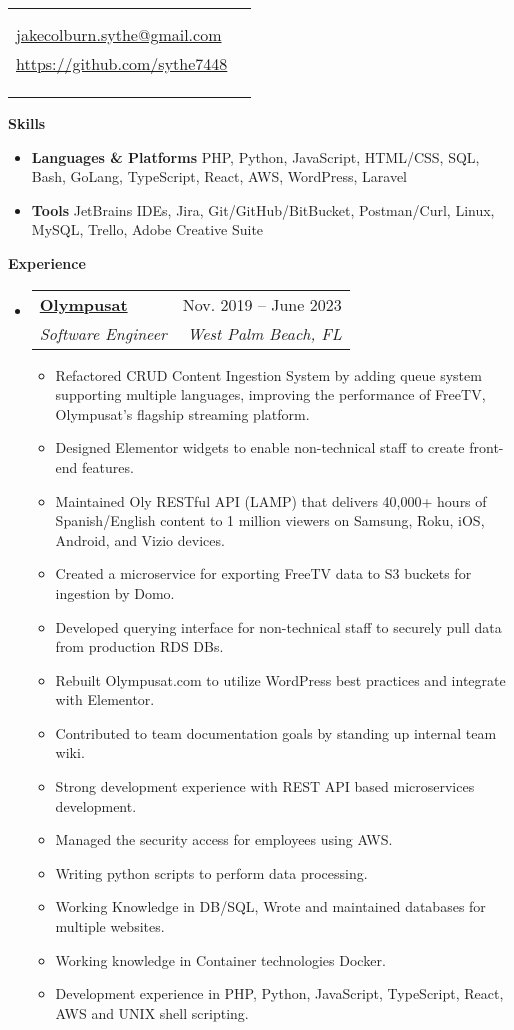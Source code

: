 \documentclass[letterpaper,10pt]{article}[leftmargin=*]
\makeatletter
\def \fullname {Jake Colburn}
\def \subtitle {}
\def \linkedinicon {\faLinkedin}
\def \linkedinlink {https://www.linkedin.com/in/jake-colburn-71401811/}
\def \linkedintext {/jake-colburn}
\def \phoneicon {\faPhone}
\def \phonetext {512-621-6131}
\def \emailicon {\faEnvelope}
\def \emaillink {mailto:jakecolburn.sythe@gmail.com}
\def \emailtext {jakecolburn.sythe@gmail.com}
\def \websiteicon {\faGithub}
\def \websitelink {https://github.com/sythe7448}
\def \websitetext {https://github.com/sythe7448}
\def \headertype {\singlecol} %
\def \entryspacing {-0pt}
\def \linkedin {\linkedinicon \hspace{3pt}\href{\linkedinlink}{\linkedintext}}
\def \phone {\phoneicon \hspace{3pt}{ \phonetext}}
\def \email {\emailicon \hspace{3pt}\href{\emaillink}{\emailtext}}
\def \website {\websiteicon \hspace{3pt}\href{\websitelink}{\websitetext}}
\renewcommand{\section}[2]{\vspace{5pt}
  \colorbox{secondary}{\color{white}\raggedbottom\normalsize\textbf{{#1}{\hspace{7pt}#2}}}
}
\newcommand{\resumeEntryStart}{\begin{itemize}[leftmargin=2.5mm]}
\newcommand{\resumeEntryEnd}{\end{itemize}\vspace{\entryspacing}}
\newcommand{\resumeItemListStart}{\begin{itemize}[leftmargin=4.5mm]}
\newcommand{\resumeItemListEnd}{\end{itemize}}
\newcommand{\resumeItem}[1]{
  \item\small{
    {#1 \vspace{-2pt}}
  }
}
\newcommand{\resumeEntryTSDL}[4]{
  \vspace{-1pt}\item[]
    \begin{tabularx}{0.97\textwidth}{X@{\hspace{60pt}}r}
      \textbf{\color{primary}#1} & {\firabook\color{accent}\small#2} \\
      \textit{\color{accent}\small#3} & \textit{\color{accent}\small#4} \\
    \end{tabularx}\vspace{-6pt}
}
\newcommand{\resumeEntryS}[2]{
  \item[]\small{
    \textbf{\color{primary}#1 }{ #2 \vspace{-6pt}}
  }
}
\newcommand{\doublecol}[6]{
  \begin{tabularx}{\textwidth}{Xr}
    {
      \begin{tabular}[c]{l}
        \fontsize{35}{45}\selectfont{\color{primary}{{\textbf{\fullname}}}} \\
        {\textit{\subtitle}} %
      \end{tabular}
    } & {
      \begin{tabular}[c]{l@{\hspace{1.5em}}l}
        {\small#4} & {\small#1} \\
        {\small#5} & {\small#2} \\
        {\small#6} & {\small#3}
      \end{tabular}
    }
  \end{tabularx}
}
\newcommand{\singlecol}[6]{
  \begin{tabularx}{\textwidth}{Xr}
    {
      \begin{tabular}[b]{l}
        \fontsize{35}{45}\selectfont{\color{primary}{{\textbf{\fullname}}}} \\
        {\textit{\subtitle}} %
      \end{tabular}
    } & {
      \begin{tabular}[c]{l}
        {\small#1} \\
        {\small#2} \\
        {\small#3} \\
        {\small#4} \\
        {\small#5} \\
        {\small#6}
      \end{tabular}
    }
  \end{tabularx}
}
\makeatother
\begin{document}


\headertype{\linkedin}{\email}{\website}{\phone}{}{} %
\vspace{-10pt} %

\section{\faGears}{Skills}
 \resumeEntryStart
  \resumeEntryS{Languages \& Platforms} { PHP, Python, JavaScript, HTML/CSS, SQL, Bash, GoLang, TypeScript, React, AWS, WordPress, Laravel}
  \resumeEntryS{Tools } {JetBrains IDEs, Jira, Git/GitHub/BitBucket, Postman/Curl, Linux, MySQL, Trello, Adobe Creative Suite}
 \resumeEntryEnd

\section{\faPieChart}{Experience}

  \resumeEntryStart
    \resumeEntryTSDL
      {\href{https://www.linkedin.com/company/olympusat/}{Olympusat}}{Nov. 2019 -- June 2023}
      {Software Engineer}{West Palm Beach, FL}
    \resumeItemListStart
      \resumeItem{Refactored CRUD Content Ingestion System by adding queue system supporting multiple languages, improving the performance of FreeTV, Olympusat’s flagship streaming platform.}
      \resumeItem{Designed Elementor widgets to enable non-technical staff to create front-end features.}
      \resumeItem{Maintained Oly RESTful API (LAMP) that delivers 40,000+ hours of Spanish/English content to 1 million viewers on Samsung, Roku, iOS, Android, and Vizio devices.}
      \resumeItem{Created a microservice for exporting FreeTV data to S3 buckets for ingestion by Domo.}
      \resumeItem{Developed querying interface for non-technical staff to securely pull data from production RDS DBs.}
      \resumeItem{Rebuilt Olympusat.com to utilize WordPress best practices and integrate with Elementor.}
      \resumeItem{Contributed to team documentation goals by standing up internal team wiki.}
      \resumeItem{Strong development experience with REST API based microservices development.}
      \resumeItem{Managed the security access for employees using AWS.}
      \resumeItem{Writing python scripts to perform data processing.}
      \resumeItem{Working Knowledge in DB/SQL, Wrote and maintained databases for multiple websites.}
      \resumeItem{Working knowledge in Container technologies Docker.}
      \resumeItem{Development experience in PHP, Python, JavaScript, TypeScript, React, AWS and UNIX shell scripting.}
    \resumeItemListEnd
  \resumeEntryEnd
\end{document}

